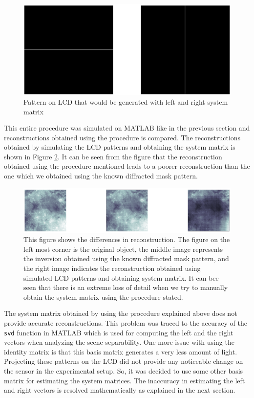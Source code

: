 \begin{figure}[h]
\centering
\includegraphics[width = \linewidth]{pics/identity_left_right.png}
\caption{Pattern on LCD that would be generated with left and right system matrix}
\label{fig:pattern_identity}
\end{figure}
This entire procedure was simulated on MATLAB like in the previous section and reconstructions obtained using the procedure is compared. The reconstructions obtained by simulating the LCD patterns and obtaining the system matrix is shown in Figure \ref{fig:rec_id}. It can be seen from the figure that the reconstruction obtained using the procedure mentioned leads to a poorer reconstruction than the one which we obtained using the known diffracted mask pattern.
\begin{figure}[h]
\centering
\includegraphics[width = \linewidth]{pics/id_reconst.png}
\caption{This figure shows the differences in reconstruction. The figure on the left most corner is the original object, the middle image represents the inversion obtained using the known diffracted mask pattern, and the right image indicates the reconstruction obtained using simulated LCD patterns and obtaining system matrix. It can bee seen that there is an extreme loss of detail when we try to manually obtain the system matrix using the procedure stated.}
\label{fig:rec_id}
\end{figure}
The system matrix obtained by using the procedure explained above does not provide accurate reconstructions. This problem was traced to the accuracy of the \texttt{svd} function in MATLAB which is used for computing the left and the right vectors when analyzing the scene separability. One more issue with using the identity matrix is that this basis matrix generates a very less amount of light. Projecting these patterns on the LCD did not provide any noticeable change on the sensor in the experimental setup. So, it was decided to use some other basis matrix for estimating the system matrices. The inaccuracy in estimating the left and right vectors is resolved mathematically as explained in the next section. 
